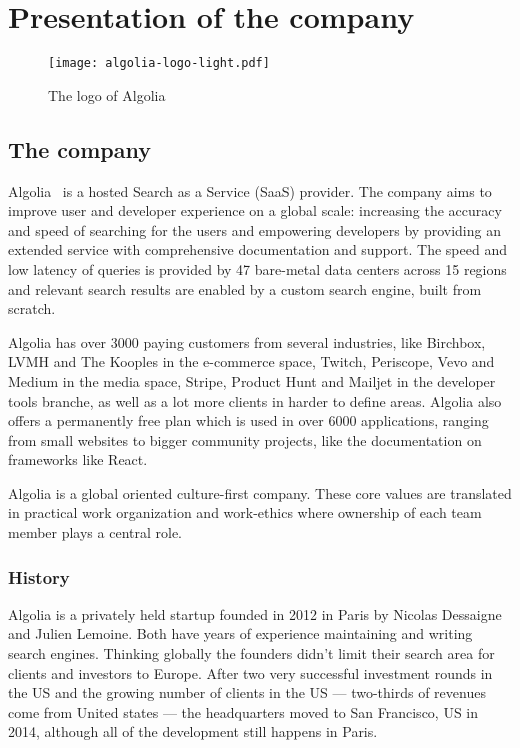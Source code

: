 
\chapter{Presentation of the company} %
\label{chp:presentation}

\begin{figure}[H]
  \centering
  \texttt{[image: algolia-logo-light.pdf]}
  \caption{The logo of Algolia~\cite{algolia-press}}
  \label{figure:company-logo}
\end{figure}

\section{The company} %
\label{sec:company}

Algolia~\cite{algolia-home} is a hosted Search as a Service (SaaS) provider. The company aims to improve user and developer experience on a global scale: increasing the accuracy and speed of searching for the users and empowering developers by providing an extended service with comprehensive documentation and support. The speed and low latency of queries is provided by 47 bare-metal data centers across 15 regions and relevant search results are enabled by a custom search engine, built from scratch.

Algolia has over 3000 paying customers from several industries, like Birchbox, LVMH and The Kooples in the e-commerce space, Twitch, Periscope, Vevo and Medium in the media space, Stripe, Product Hunt and Mailjet in the developer tools branche, as well as a lot more clients in harder to define areas. Algolia also offers a permanently free plan which is used in over 6000 applications, ranging from small websites to bigger community projects, like the documentation on frameworks like React.

Algolia is a global oriented culture-first company. These core values are translated in practical work organization and work-ethics where ownership of each team member plays a central role.

\subsection{History}
\label{sub:history}

Algolia is a privately held startup founded in 2012 in Paris by Nicolas Dessaigne and Julien Lemoine. Both have years of experience maintaining and writing search engines. Thinking globally the founders didn't limit their search area for clients and investors to Europe. After two very successful investment rounds in the US and the growing number of clients in the US --- two-thirds of revenues come from United states \cite{less-mis} --- the headquarters moved to San Francisco, US in 2014, although all of the development still happens in Paris. 

